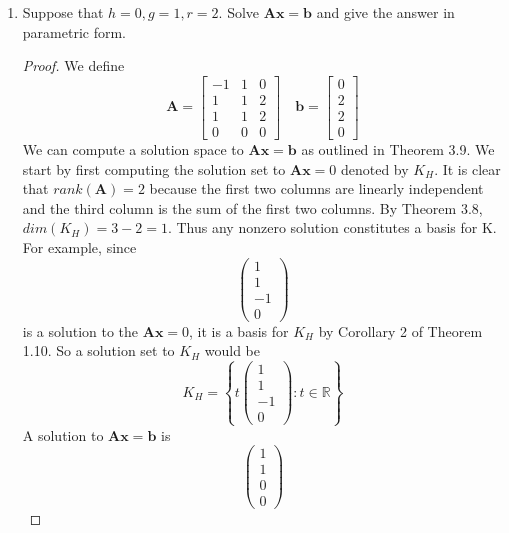 \documentclass[11pt]{scrartcl}
\begin{document}
\begin{enumerate}[label=\alph*.]
{	      }
	\item{
	      Suppose that $h = 0, g = 1, r = 2$. Solve $\mathbf{Ax=b}$ and give the answer
	      in parametric form.
	      \begin{proof}
		      We define $$\mathbf{A} =
			      \begin{bmatrix}
				      -1 & 1 & 0 \\
				      1  & 1 & 2 \\
				      1  & 1 & 2 \\
				      0  & 0 & 0
			      \end{bmatrix}
			      \quad
			      \mathbf{b} =
			      \begin{bmatrix}
				      0 \\
				      2 \\
				      2 \\
				      0
			      \end{bmatrix}
		      $$
		      We can compute a solution space to $\mathbf{Ax=b}$ as outlined in Theorem 3.9. We start by first computing the
		      solution set to $\mathbf{Ax}=0$ denoted by $K_H$. It is clear that $rank(\mathbf{A}) = 2$ because the first two
		      columns are linearly independent and the third column is the sum of the first two columns.
		      By Theorem 3.8, $dim(K_H) = 3 - 2 = 1$. Thus any nonzero solution constitutes a basis for K. For example, since
		      $$
			      \begin{pmatrix}
				      1  \\
				      1  \\
				      -1 \\
				      0
			      \end{pmatrix}
		      $$
		      is a solution to the $\mathbf{Ax}=0$, it is a basis for $K_H$ by Corollary 2 of Theorem 1.10.
		      So a solution set to $K_H$ would be
		      \[
			      K_H=
			      \left\{
			      t\begin{pmatrix}
				      1  \\
				      1  \\
				      -1 \\
				      0
			      \end{pmatrix}: t \in \mathbb{R}
			      \right\}
		      \]
		      A solution to $\mathbf{Ax=b}$ is
		      $$
			      \begin{pmatrix}
				      1 \\
				      1 \\
				      0 \\
				      0
			      \end{pmatrix}
$$
\end{proof}}
\end{enumerate}
\end{document}
